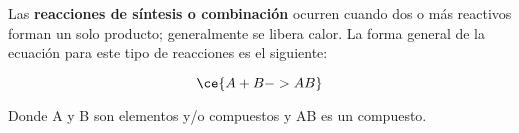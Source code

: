 \begin{warncard}[adjusted title={Reacción de síntesis o combinación}]
    Las \textbf{reacciones de síntesis o combinación} ocurren cuando dos o más reactivos forman un solo producto; generalmente se libera calor. La forma general de la ecuación para este tipo de reacciones es el siguiente:

    \[\ce{A + B -> AB}\]

    Donde A y B son elementos y/o compuestos y AB es un compuesto.
\end{warncard}